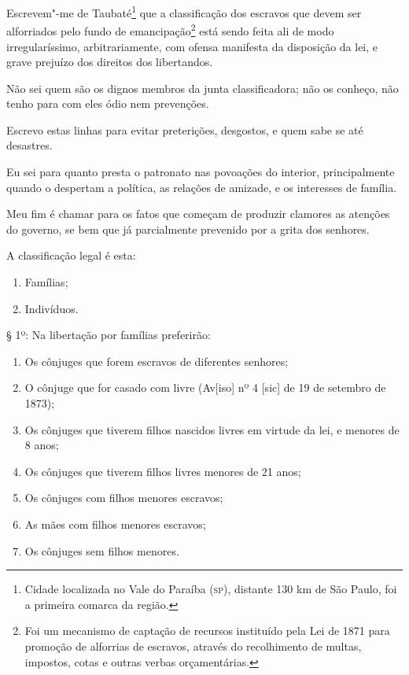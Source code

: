 \noindent{}Escrevem"-me de Taubaté\footnote{Cidade localizada no Vale do Paraíba
  (\textsc{sp}), distante 130 km de São Paulo, foi a primeira comarca da região.}
que a classificação dos escravos que devem ser alforriados pelo fundo de
emancipação\footnote{Foi um mecanismo de captação de recursos
  instituído pela Lei de 1871 para promoção de alforrias de escravos,
  através do recolhimento de multas, impostos, cotas e outras verbas
  orçamentárias.} está sendo feita ali de modo irregularíssimo,
arbitrariamente, com ofensa manifesta da disposição da lei, e grave
prejuízo dos direitos dos libertandos.

Não sei quem são os dignos membros da junta classificadora; não os
conheço, não tenho para com eles ódio nem prevenções.

Escrevo estas linhas para evitar preterições, desgostos, e quem sabe se
até desastres.

Eu sei para quanto presta o patronato nas povoações do interior,
principalmente quando o despertam a política, as relações de amizade, e
os interesses de família.

Meu fim é chamar para os fatos que começam de produzir clamores as
atenções do governo, se bem que já parcialmente prevenido por a grita
dos senhores.

A classificação legal é esta:

\begin{enumerate}[label={\scshape\roman*.}]
\item Famílias;

\item Indivíduos.
\end{enumerate}

§ 1º: Na libertação por famílias preferirão:
\begin{enumerate}[label={\scshape\roman*.}]
\item Os cônjuges que forem escravos de diferentes senhores;

\item O cônjuge que for casado com livre (Av{[}iso{]} nº 4 {[}sic{]} de 19
de setembro de 1873);

\item Os cônjuges que tiverem filhos nascidos livres em virtude da lei, e
menores de 8 anos;

\item Os cônjuges que tiverem filhos livres menores de 21 anos;

\item Os cônjuges com filhos menores escravos;

\item As mães com filhos menores escravos;

\item Os cônjuges sem filhos menores.
\end{enumerate}

